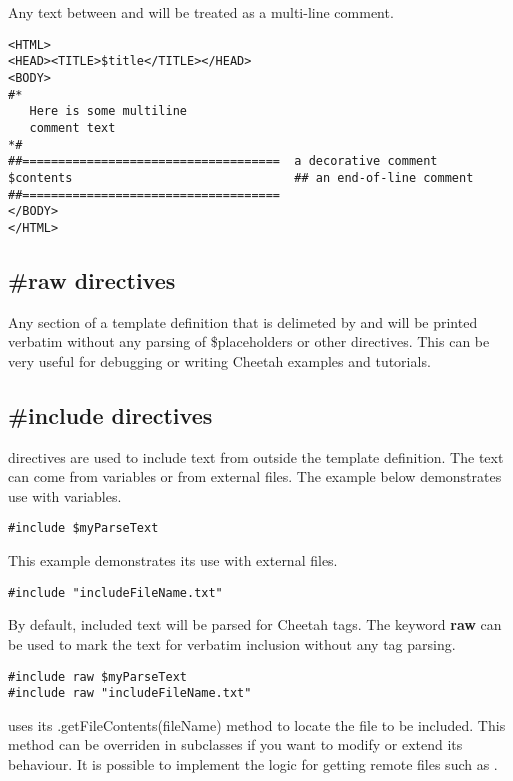Any text between \code{\#*} and \code{*\#} will be treated as a multi-line
comment.
\begin{verbatim}
<HTML>
<HEAD><TITLE>$title</TITLE></HEAD>
<BODY>
#*
   Here is some multiline
   comment text
*#
##====================================  a decorative comment
$contents                               ## an end-of-line comment
##====================================
</BODY>
</HTML>
\end{verbatim}

\subsection{\#raw directives}
Any section of a template definition that is delimeted by  and
 will be printed verbatim without any parsing of
\$placeholders or other directives.  This can be very useful for debugging or
writing Cheetah examples and tutorials.

\subsection{\#include directives}

 directives are used to include text from outside the template
definition.  The text can come from  variables or from
external files.  The example below demonstrates use with 
variables.

\begin{verbatim}
#include $myParseText
\end{verbatim}

This example demonstrates its use with external files.
\begin{verbatim}
#include "includeFileName.txt"
\end{verbatim}

By default, included text will be parsed for Cheetah tags.  The keyword
{\bf raw} can be used to mark the text for verbatim inclusion without any tag
parsing.

\begin{verbatim}
#include raw $myParseText
#include raw "includeFileName.txt"
\end{verbatim}

 uses its .getFileContents(fileName) method to locate the file to
be included.  This method can be overriden in subclasses if you want to modify
or extend its behaviour.  It is possible to implement the logic for getting 
remote files such as .


